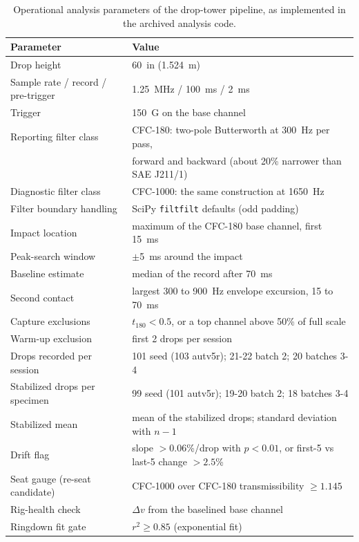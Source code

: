 \documentclass[11pt]{article}
\begin{document}
\begin{table}[ht]
  \centering
  \caption{Operational analysis parameters of the drop-tower pipeline,
    as implemented in the archived analysis code.}
  \label{tab:si-processing}
  \small
  \begin{tabular}{@{}ll@{}}
    \toprule
    Parameter & Value \\
    \midrule
    Drop height & \SI{60}{in} (\SI{1.524}{m}) \\
    Sample rate / record / pre-trigger & \SI{1.25}{MHz} / \SI{100}{ms} / \SI{2}{ms} \\
    Trigger & \SI{150}{G} on the base channel \\
    Reporting filter class & CFC-180: two-pole Butterworth at \SI{300}{Hz} per pass, \\
     & forward and backward (about 20\% narrower than SAE J211/1) \\
    Diagnostic filter class & CFC-1000: the same construction at \SI{1650}{Hz} \\
    Filter boundary handling & SciPy \texttt{filtfilt} defaults (odd padding) \\
    Impact location & maximum of the CFC-180 base channel, first \SI{15}{ms} \\
    Peak-search window & $\pm$\SI{5}{ms} around the impact \\
    Baseline estimate & median of the record after \SI{70}{ms} \\
    Second contact & largest 300 to \SI{900}{Hz} envelope excursion, 15 to \SI{70}{ms} \\
    Capture exclusions & $t_{180} < 0.5$, or a top channel above 50\% of full scale \\
    Warm-up exclusion & first 2 drops per session \\
    Drops recorded per session & 101 seed (103 autv5r); 21-22 batch 2; 20 batches 3-4 \\
    Stabilized drops per specimen & 99 seed (101 autv5r); 19-20 batch 2; 18 batches 3-4 \\
    Stabilized mean & mean of the stabilized drops; standard deviation with $n-1$ \\
    Drift flag & slope $> 0.06$\%/drop with $p < 0.01$, or first-5 vs last-5 change $> 2.5$\% \\
    Seat gauge (re-seat candidate) & CFC-1000 over CFC-180 transmissibility $\geq 1.145$ \\
    Rig-health check & $\Delta v$ from the baselined base channel \\
    Ringdown fit gate & $r^2 \ge 0.85$ (exponential fit) \\
    \bottomrule
  \end{tabular}
\end{table}
\end{document}
